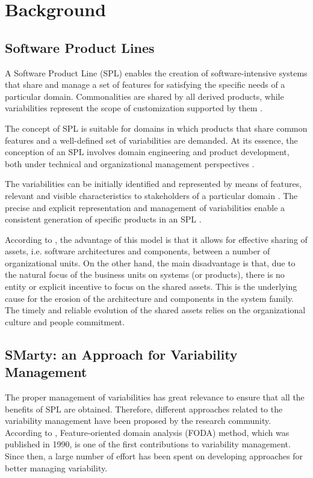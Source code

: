 \section{Background}\label{section2}

\subsection{Software Product Lines}

A Software Product Line (SPL) enables the creation of software-intensive systems that share and manage a set of features for satisfying the specific needs of a particular domain. Commonalities are shared by all derived products, while variabilities represent the scope of customization supported by them \cite{clements02,bockle05,vanderlinden07}.

The concept of SPL is suitable for domains in which products that share common features and a well-defined set of variabilities are demanded. At its essence, the conception of an SPL involves domain engineering and product development, both under technical and organizational management perspectives \cite{bockle05,vanderlinden07}.

The variabilities can be initially identified and represented by means of features, relevant and visible characteristics to stakeholders of a particular domain \cite{bosch01}. The precise and explicit representation and management of variabilities enable a consistent generation of specific products in an SPL \cite{chen11,galster2014}. 

According to \cite{bosch01}, the advantage of this model is that it allows for effective sharing of assets, i.e. software architectures and components, between a number of organizational units. On the other hand, the main disadvantage is that, due to the natural focus of the business units on systems (or products), there is no entity or explicit incentive to focus on the shared assets. This is the underlying cause for the erosion of the architecture and components in the system family. The timely and reliable evolution of the shared assets relies on the organizational culture and people commitment.

\subsection{SMarty: an Approach for Variability Management}

The proper management of variabilities has great relevance to ensure that all the benefits of SPL are obtained. Therefore, different approaches related to the variability management have been proposed by the research community. According to \cite{chen11}, Feature-oriented domain analysis (FODA) method, which was published in 1990, is one of the first contributions to variability management. Since then, a large number of effort has been spent on developing approaches for better managing variability.


